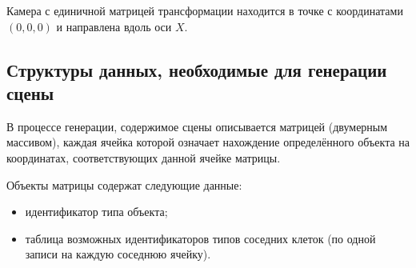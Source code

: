 Камера с единичной матрицей трансформации находится в точке с координатами $(0,0,0)$ и направлена вдоль оси $X$.

\subsection*{Структуры данных, необходимые для генерации сцены}

В процессе генерации, содержимое сцены описывается матрицей (двумерным массивом), каждая ячейка которой означает нахождение определённого объекта на координатах, соответствующих данной ячейке матрицы.

Объекты матрицы содержат следующие данные:
\begin{itemize}
    \item идентификатор типа объекта;
    \item таблица возможных идентификаторов типов соседних клеток (по одной записи на каждую соседнюю ячейку).
\end{itemize}

